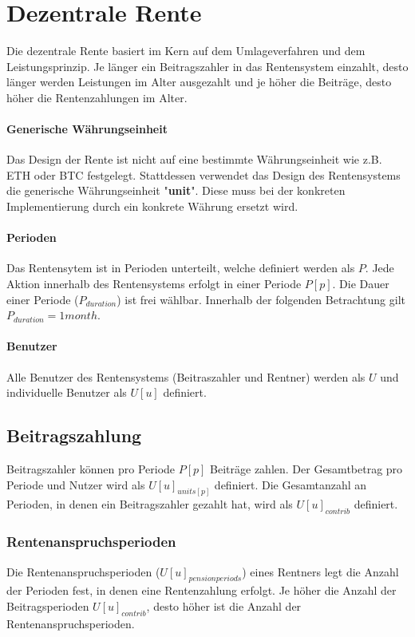 \section{Dezentrale Rente}
Die dezentrale Rente basiert im Kern auf dem Umlageverfahren und dem
Leistungsprinzip. Je länger ein Beitragszahler in das Rentensystem einzahlt, 
desto länger werden Leistungen im Alter ausgezahlt und je höher die Beiträge,
desto höher die Rentenzahlungen im Alter.

\paragraph{Generische Währungseinheit} Das Design der Rente ist nicht auf eine bestimmte 
Währungseinheit wie z.B. ETH oder BTC festgelegt. Stattdessen verwendet das Design des
Rentensystems die generische Währungseinheit "\textbf{unit}". Diese muss bei der konkreten
Implementierung durch ein konkrete Währung ersetzt wird.

\paragraph{Perioden} Das Rentensytem ist in Perioden unterteilt, welche definiert werden als $P$. Jede Aktion innerhalb des Rentensystems erfolgt
in einer Periode $P[p]$. Die Dauer einer Periode ($P_{duration}$) ist frei wählbar. Innerhalb der folgenden Betrachtung gilt $P_{duration} = 1 month$.

\paragraph{Benutzer} Alle Benutzer des Rentensystems (Beitraszahler und Rentner) werden als $U$ und individuelle Benutzer als $U[u]$ definiert.

\subsection{Beitragszahlung}

Beitragszahler können pro Periode $P[p]$ Beiträge zahlen. Der Gesamtbetrag pro Periode und Nutzer wird als $U[u]_{units[p]}$ definiert. Die Gesamtanzahl an Perioden, in denen ein Beitragszahler gezahlt hat, wird als $U[u]_{contrib}$ definiert.

\subsubsection*{Rentenanspruchsperioden}
Die Rentenanspruchsperioden ($U[u]_{pensionperiods}$) eines Rentners legt die Anzahl der Perioden fest,
in denen eine Rentenzahlung erfolgt. Je höher die Anzahl der Beitragsperioden
$U[u]_{contrib}$, desto höher ist die Anzahl der Rentenanspruchsperioden.

